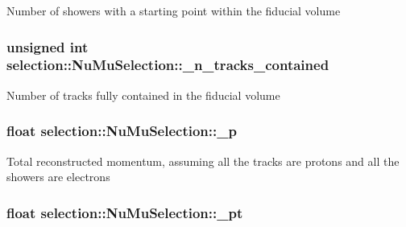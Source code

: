 Number of showers with a starting point within the fiducial volume \hypertarget{classselection_1_1NuMuSelection_a4f7501393a59de50a8547b6ff2f286b8}{
\subsubsection[{\-\_\-n\-\_\-tracks\-\_\-contained}]{\setlength{\rightskip}{0pt plus 5cm}unsigned int selection\-::\-Nu\-Mu\-Selection\-::\-\_\-n\-\_\-tracks\-\_\-contained\hspace{0.3cm}{\ttfamily [private]}}}\label{classselection_1_1NuMuSelection_a4f7501393a59de50a8547b6ff2f286b8}
Number of tracks fully contained in the fiducial volume \hypertarget{classselection_1_1NuMuSelection_a821979901c138eca118246a1eeedcd80}{
\subsubsection[{\-\_\-p}]{\setlength{\rightskip}{0pt plus 5cm}float selection\-::\-Nu\-Mu\-Selection\-::\-\_\-p\hspace{0.3cm}{\ttfamily [private]}}}\label{classselection_1_1NuMuSelection_a821979901c138eca118246a1eeedcd80}
Total reconstructed momentum, assuming all the tracks are protons and all the showers are electrons \hypertarget{classselection_1_1NuMuSelection_aab5bb47332ae2489a5ab96078397d075}{
\subsubsection[{\-\_\-pt}]{\setlength{\rightskip}{0pt plus 5cm}float selection\-::\-Nu\-Mu\-Selection\-::\-\_\-pt\hspace{0.3cm}{\ttfamily [private]}}}\label{classselection_1_1NuMuSelection_aab5bb47332ae2489a5ab96078397d075}
